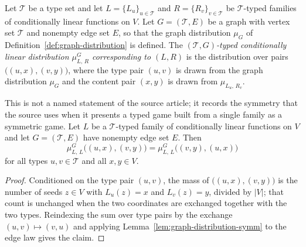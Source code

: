 \begin{definition}\label{def:typed-cl-distributions}
	Let $\mathcal T$ be a type set and let $L = \{L_u\}_{u \in \mathcal T}$ and $R = \{R_v\}_{v \in \mathcal T}$ be $\mathcal T$-typed families of conditionally linear functions on $V$. Let $G = (\mathcal T, E)$ be a graph with vertex set $\mathcal T$ and nonempty edge set $E$, so that the graph distribution $\mu_G$ of Definition~\ref{def:graph-distribution} is defined. The \emph{$(\mathcal T, G)$-typed conditionally linear distribution $\mu^G_{L,\,R}$ corresponding to $(L, R)$} is the distribution over pairs $\bigl( (u, x), (v, y) \bigr)$, where the type pair $(u,v)$ is drawn from the graph distribution $\mu_G$ and the content pair $(x,y)$ is drawn from $\mu_{L_u,\,R_v}$.
\end{definition}

\begin{lemma}\label{lem:typed-cl-distribution-symm}
	\leanok
	This is not a named statement of the source article; it records the symmetry that the source uses when it presents a typed game built from a single family as a symmetric game. Let $L$ be a $\mathcal T$-typed family of conditionally linear functions on $V$ and let $G = (\mathcal T, E)$ have nonempty edge set $E$. Then
	\[
		\mu^G_{L,\,L}\bigl((u, x), (v, y)\bigr) = \mu^G_{L,\,L}\bigl((v, y), (u, x)\bigr)
	\]
	for all types $u, v \in \mathcal T$ and all $x, y \in V$.
\end{lemma}
\begin{proof}
	\leanok
	Conditioned on the type pair $(u,v)$, the mass of $\bigl((u,x),(v,y)\bigr)$ is the number of seeds $z \in V$ with $L_u(z) = x$ and $L_v(z) = y$, divided by $|V|$; that count is unchanged when the two coordinates are exchanged together with the two types. Reindexing the sum over type pairs by the exchange $(u,v) \mapsto (v,u)$ and applying Lemma~\ref{lem:graph-distribution-symm} to the edge law gives the claim.
\end{proof}

